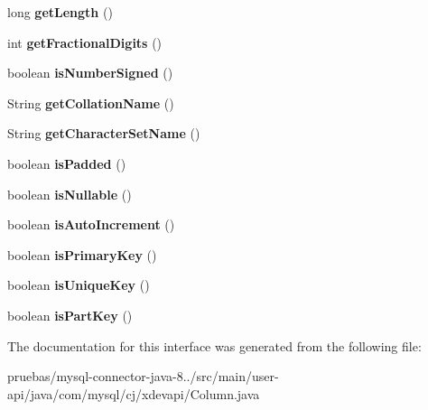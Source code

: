 \begin{DoxyCompactItemize}
long {\bfseries get\+Length} ()
\item 
\mbox{\label{interfacecom_1_1mysql_1_1cj_1_1xdevapi_1_1_column_ac7c43e813c038df1021183627a3dffa7}} 
int {\bfseries get\+Fractional\+Digits} ()
\item 
\mbox{\label{interfacecom_1_1mysql_1_1cj_1_1xdevapi_1_1_column_ab19cb4c9c5ad0b8900650cab7b5f9bd6}} 
boolean {\bfseries is\+Number\+Signed} ()
\item 
\mbox{\label{interfacecom_1_1mysql_1_1cj_1_1xdevapi_1_1_column_af3f5205b507019a4372c02452d3650b1}} 
String {\bfseries get\+Collation\+Name} ()
\item 
\mbox{\label{interfacecom_1_1mysql_1_1cj_1_1xdevapi_1_1_column_acbe28bced9088c55b3d24bc62341a8b5}} 
String {\bfseries get\+Character\+Set\+Name} ()
\item 
\mbox{\label{interfacecom_1_1mysql_1_1cj_1_1xdevapi_1_1_column_a8321f346d06a83d45e78d10b44bb2359}} 
boolean {\bfseries is\+Padded} ()
\item 
\mbox{\label{interfacecom_1_1mysql_1_1cj_1_1xdevapi_1_1_column_aca125bcbe7d9b423502b2dbe864b85f9}} 
boolean {\bfseries is\+Nullable} ()
\item 
\mbox{\label{interfacecom_1_1mysql_1_1cj_1_1xdevapi_1_1_column_a497ba06454ec1c5f48f23f890ccc241f}} 
boolean {\bfseries is\+Auto\+Increment} ()
\item 
\mbox{\label{interfacecom_1_1mysql_1_1cj_1_1xdevapi_1_1_column_a4c736251ff3d1d2d5e7442458f0c03e4}} 
boolean {\bfseries is\+Primary\+Key} ()
\item 
\mbox{\label{interfacecom_1_1mysql_1_1cj_1_1xdevapi_1_1_column_a6ce1520bc455622d374b2ad758b683e2}} 
boolean {\bfseries is\+Unique\+Key} ()
\item 
\mbox{\label{interfacecom_1_1mysql_1_1cj_1_1xdevapi_1_1_column_aea6f831cb621dfac512d6d2d95fbeb87}} 
boolean {\bfseries is\+Part\+Key} ()
\end{DoxyCompactItemize}


The documentation for this interface was generated from the following file\+:\begin{DoxyCompactItemize}
\item 
pruebas/mysql-\/connector-\/java-\/8../src/main/user-\/api/java/com/mysql/cj/xdevapi/Column.\+java\end{DoxyCompactItemize}
